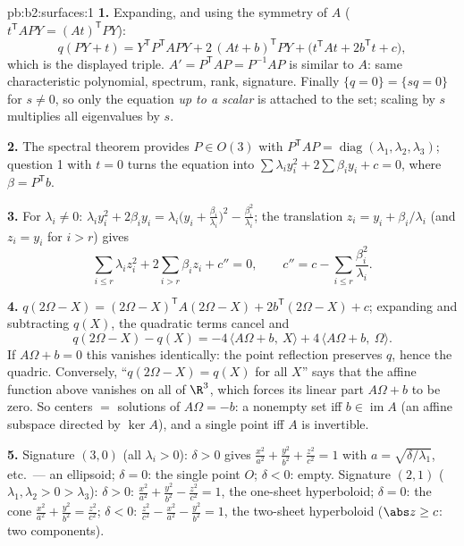\begin{solution}{pb:b2:surfaces:1}
\textbf{1.} Expanding, and using the symmetry of $A$
($t^{\mathsf T}\!APY = (At)^{\mathsf T}PY$):
\[
q(PY + t) = Y^{\mathsf T}P^{\mathsf T}\!APY +
2\,(At + b)^{\mathsf T}PY + \bigl(t^{\mathsf T}\!At +
2b^{\mathsf T}t + c\bigr),
\]
which is the displayed triple. $A' = P^{\mathsf T}\!AP =
P^{-1}AP$ is similar to $A$: same characteristic polynomial,
spectrum, rank, signature. Finally $\{q = 0\} = \{sq = 0\}$
for $s \neq 0$, so only the equation \emph{up to a scalar} is
attached to the set; scaling by $s$ multiplies all eigenvalues
by $s$.

\textbf{2.} The spectral theorem provides $P \in O(3)$ with
$P^{\mathsf T}\!AP = \operatorname{diag}(\lambda_1, \lambda_2,
\lambda_3)$; question 1 with $t = 0$ turns the equation into
$\sum\lambda_iy_i^2 + 2\sum\beta_iy_i + c = 0$, where $\beta =
P^{\mathsf T}b$.

\textbf{3.} For $\lambda_i \neq 0$: $\lambda_iy_i^2 +
2\beta_iy_i = \lambda_i\bigl(y_i +
\frac{\beta_i}{\lambda_i}\bigr)^2 -
\frac{\beta_i^2}{\lambda_i}$; the translation $z_i = y_i +
\beta_i/\lambda_i$ (and $z_i = y_i$ for $i > r$) gives
\[
\sum_{i \leq r}\lambda_iz_i^2 + 2\sum_{i > r}\beta_iz_i +
c'' = 0, \qquad
c'' = c - \sum_{i\leq r}\frac{\beta_i^2}{\lambda_i}.
\]

\textbf{4.} $q(2\Omega - X) = (2\Omega - X)^{\mathsf T}
A(2\Omega - X) + 2b^{\mathsf T}(2\Omega - X) + c$; expanding
and subtracting $q(X)$, the quadratic terms cancel and
\[
q(2\Omega - X) - q(X) = -4\,\langle A\Omega + b,\ X\rangle +
4\,\langle A\Omega + b,\ \Omega\rangle .
\]
If $A\Omega + b = 0$ this vanishes identically: the point
reflection preserves $q$, hence the quadric. Conversely,
``$q(2\Omega - X) = q(X)$ for all $X$'' says that the affine
function above vanishes on all of $\R^3$, which forces its
linear part $A\Omega + b$ to be zero. So centers $=$ solutions of
$A\Omega = -b$: a nonempty set iff $b \in \operatorname{im}A$
(an affine subspace directed by $\ker A$), and a single point
iff $A$ is invertible.

\textbf{5.} Signature $(3,0)$ (all $\lambda_i > 0$): $\delta >
0$ gives $\frac{x^2}{a^2} + \frac{y^2}{b^2} + \frac{z^2}{c^2}
= 1$ with $a = \sqrt{\delta/\lambda_1}$, etc.\ --- an
ellipsoid; $\delta = 0$: the single point $O$; $\delta < 0$:
empty. Signature $(2,1)$ ($\lambda_1, \lambda_2 > 0 >
\lambda_3$): $\delta > 0$: $\frac{x^2}{a^2} + \frac{y^2}{b^2}
- \frac{z^2}{c^2} = 1$, the one-sheet hyperboloid; $\delta =
0$: the cone $\frac{x^2}{a^2} + \frac{y^2}{b^2} =
\frac{z^2}{c^2}$; $\delta < 0$: $\frac{z^2}{c^2} -
\frac{x^2}{a^2} - \frac{y^2}{b^2} = 1$, the two-sheet
hyperboloid ($\abs z \geq c$: two components).


\end{solution}
